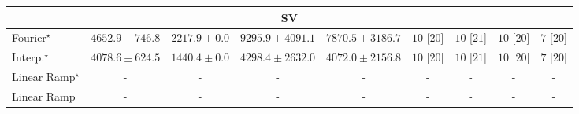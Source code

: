 \begin{tabular}{l|cccc|cccc|}
\cline{1-9}
\multicolumn{9}{c}{\rule{0pt}{8pt}SV} \\
\midrule
Fourier$^\star$ & {\cellcolor[HTML]{99B8D8}} \color[HTML]{000000} $4652.9\pm 746.8$ & {\cellcolor[HTML]{F0EAF4}} \color[HTML]{000000} $2217.9\pm 0.0$ & {\cellcolor[HTML]{023858}} \color[HTML]{F1F1F1} $9295.9\pm 4091.1$ & {\cellcolor[HTML]{04649D}} \color[HTML]{F1F1F1} $7870.5\pm 3186.7$ & {\cellcolor[HTML]{49006A}} \color[HTML]{F1F1F1} $10$ [$20$] & {\cellcolor[HTML]{49006A}} \color[HTML]{F1F1F1} $10$ [$21$] & {\cellcolor[HTML]{49006A}} \color[HTML]{F1F1F1} $10$ [$20$] & {\cellcolor[HTML]{CD238F}} \color[HTML]{F1F1F1} $7$ [$20$] \\
Interp.$^\star$ & {\cellcolor[HTML]{B4C4DF}} \color[HTML]{000000} $4078.6\pm 624.5$ & {\cellcolor[HTML]{FFF7FB}} \color[HTML]{000000} $1440.4\pm 0.0$ & {\cellcolor[HTML]{A9BFDC}} \color[HTML]{000000} $4298.4\pm 2632.0$ & {\cellcolor[HTML]{B4C4DF}} \color[HTML]{000000} $4072.0\pm 2156.8$ & {\cellcolor[HTML]{49006A}} \color[HTML]{F1F1F1} $10$ [$20$] & {\cellcolor[HTML]{49006A}} \color[HTML]{F1F1F1} $10$ [$21$] & {\cellcolor[HTML]{49006A}} \color[HTML]{F1F1F1} $10$ [$20$] & {\cellcolor[HTML]{CD238F}} \color[HTML]{F1F1F1} $7$ [$20$] \\
Linear Ramp$^\star$ & {\cellcolor[HTML]{000000}} \color[HTML]{F1F1F1} {\cellcolor{white}} \color{black} - & {\cellcolor[HTML]{000000}} \color[HTML]{F1F1F1} {\cellcolor{white}} \color{black} - & {\cellcolor[HTML]{000000}} \color[HTML]{F1F1F1} {\cellcolor{white}} \color{black} - & {\cellcolor[HTML]{000000}} \color[HTML]{F1F1F1} {\cellcolor{white}} \color{black} - & {\cellcolor[HTML]{000000}} \color[HTML]{F1F1F1} {\cellcolor{white}} \color{black} - & {\cellcolor[HTML]{000000}} \color[HTML]{F1F1F1} {\cellcolor{white}} \color{black} - & {\cellcolor[HTML]{000000}} \color[HTML]{F1F1F1} {\cellcolor{white}} \color{black} - & {\cellcolor[HTML]{000000}} \color[HTML]{F1F1F1} {\cellcolor{white}} \color{black} - \\
Linear Ramp & {\cellcolor[HTML]{000000}} \color[HTML]{F1F1F1} {\cellcolor{white}} \color{black} - & {\cellcolor[HTML]{000000}} \color[HTML]{F1F1F1} {\cellcolor{white}} \color{black} - & {\cellcolor[HTML]{000000}} \color[HTML]{F1F1F1} {\cellcolor{white}} \color{black} - & {\cellcolor[HTML]{000000}} \color[HTML]{F1F1F1} {\cellcolor{white}} \color{black} - & {\cellcolor[HTML]{000000}} \color[HTML]{F1F1F1} {\cellcolor{white}} \color{black} - & {\cellcolor[HTML]{000000}} \color[HTML]{F1F1F1} {\cellcolor{white}} \color{black} - & {\cellcolor[HTML]{000000}} \color[HTML]{F1F1F1} {\cellcolor{white}} \color{black} - & {\cellcolor[HTML]{000000}} \color[HTML]{F1F1F1} {\cellcolor{white}} \color{black} - \\

\end{tabular}
